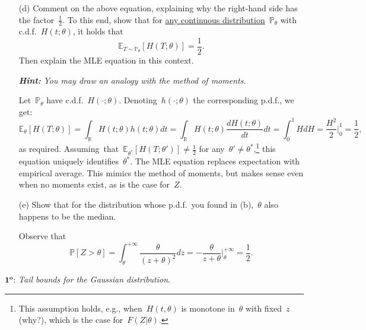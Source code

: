 \documentclass[11pt]{article}
\newcommand{\proofstep}[1]{$\boldsymbol{{#1}^o}$}
\newcommand{\R}{\mathds{R}}
\newcommand{\E}{\mathds{E}}
\newcommand{\Prob}{\mathds{P}}
\newcommand{\vsp}{\vspace{0.3cm}}
\newcommand{\odima}[1]{{\color{red} #1}}
\begin{document}
\begin{itemize}
\item[(d)]
Comment on the above equation, explaining why the right-hand side has the factor~$\frac{1}{2}$. 
To this end, show that for \underline{any continuous distribution}~$\Prob_{\theta}$ with c.d.f.~$H(t; \theta)$, it holds that
\[
\E_{T \sim \Prob_{\theta}} [H(T; \theta)] = \frac{1}{2}.
\]
Then explain the MLE equation in this context. 

{\bf\em  Hint:} {\em You may draw an analogy with the method of moments.}

\odima{
Let~$\Prob_{\theta}$ have c.d.f.~$H(\cdot; \theta)$. Denoting~$h(\cdot; \theta)$ the corresponding p.d.f., we get:
\[
\E_{\theta}[H(T; \theta)] = \int_{\R} H(t; \theta) h(t;\theta) dt = \int_{\R} H(t; \theta) \frac{d H(t;\theta)}{dt} dt = \int_{0}^{1} H d H = \frac{H^2}{2} \bigg\vert_{0}^1 = \frac{1}{2}, 
\]
as required.  
Assuming~that~$\E_{\theta^*} [H(T; \theta')] \ne \frac{1}{2}$ for any~$\theta' \ne \theta^*$,\footnote{This assumption holds, e.g., when~$H(t,\theta)$ is monotone in~$\theta$ with fixed~$z$ (why?), which is the case for~$F(Z|\theta)$.}   this equation uniquely identifies~$\theta^*$. 
The MLE equation replaces expectation with empirical average. This mimics the method of moments, but makes sense even when no moments exist, as is the case for~$Z$.
}

\item[(e)] 
Show that for the distribution whose p.d.f.~you found in (b),~$\theta$ also happens to be the median. 

\odima{
Observe that
\[
\Prob[Z > \theta] 
= \int_{\theta}^{+\infty} \frac{\theta}{(z+\theta)^2} dz = -\frac{\theta}{z+\theta} \bigg|_{\theta}^{+\infty} = \frac{1}{2}.
\]
}

\end{itemize}


\vsp 

\newpage 

\fi 

\proofstep{1}: {\em Tail bounds for the Gaussian distribution}. 
\end{document}
